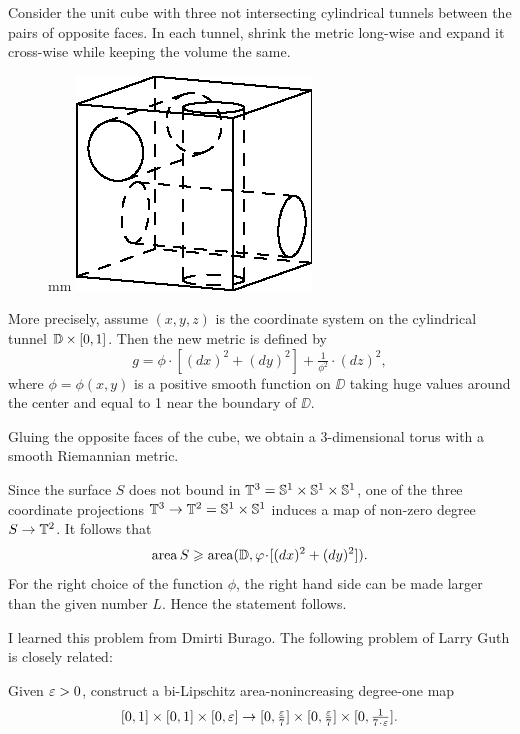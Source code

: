 Consider the unit cube with three not intersecting cylindrical tunnels  
between the pairs of opposite faces.
In each tunnel, shrink the metric long-wise and expand it  cross-wise while keeping the volume the same.

\medskip

\begin{figure}
 mm
\centering
\includegraphics{asy/cube}
\end{figure}

More precisely, assume $(x,y,z)$ is the coordinate system on the cylindrical tunnel $\DD\z\times [0,1]$. 
Then the new metric is defined by
\[g=\phi\cdot [(dx)^2+ (dy)^2]+\tfrac1{\phi^2}\cdot (dz)^2,\]
where $\phi=\phi(x,y)$ is a positive smooth function on $\DD$ taking huge values around the center and equal to 1 near the boundary of $\DD$.


Gluing the opposite faces of the cube, we obtain a 3-dimensional torus with a smooth Riemannian metric.

Since the surface $S$ does not bound in $\mathbb{T}^3=\mathbb{S}^1\times\mathbb{S}^1\times\mathbb{S}^1$,
one of the three coordinate projections $\mathbb{T}^3\to\mathbb{T}^2=\mathbb{S}^1\times\mathbb{S}^1$
induces a map of non-zero degree $S\to\mathbb{T}^2$.
It follows that 
\[\area S\ge  \area(\DD,\phi\cdot [(dx)^2+ (dy)^2]).\]
For the right choice of the function $\phi$, the right hand side can be made larger than the given number $L$.
Hence the statement follows.
\qeds

I learned this problem from Dmirti Burago.
The following problem of Larry Guth \cite{guth} is closely related:

\begin{pr}
Given $\varepsilon>0$, construct a bi-Lipschitz area-nonincreasing degree-one map 
\[[0,1]\times[0,1]\times [0,\eps]\to [0,\tfrac\eps7]\times [0,\tfrac\eps7]\times [0,\tfrac1{7\cdot\eps}].\]

\end{pr}


